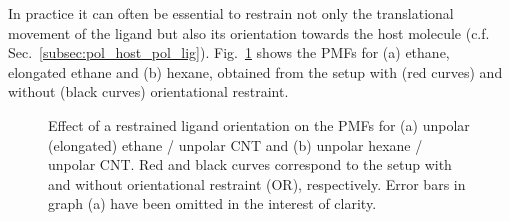 \documentclass[9pt,lessons,pubversion]{livecoms}
\begin{document}
In practice it can often be essential to restrain not only the translational movement of the ligand but also its orientation towards the host molecule (c.f. Sec.~\ref{subsec:pol_host_pol_lig}).
Fig.~\ref{fig:OriRest} shows the PMFs for (a) ethane, elongated ethane and (b) hexane, obtained from the setup with (red curves) and without (black curves) orientational restraint.
%
\begin{figure}[htb!]
  \centering    
  \caption{
  Effect of a restrained ligand orientation on the PMFs for (a) unpolar (elongated) ethane / unpolar CNT and (b) unpolar hexane / unpolar CNT.
  Red and black curves correspond to the setup with and without orientational restraint (OR), respectively.
  Error bars in graph (a) have been omitted in the interest of clarity.
  }
  \label{fig:OriRest}
\end{figure}
\end{document}
